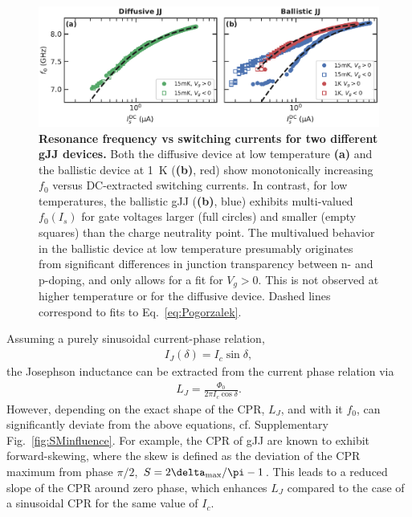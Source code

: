 \begin{figure}[t]
	\centering
	\includegraphics[width=\linewidth]{chapter-gJJ-CPR/figs/Figure2}
	\caption{
		\textbf{Resonance frequency vs switching currents for two different gJJ devices.}
		Both the diffusive device at low temperature \textbf{(a)} and the ballistic device at \SI{1}{\kelvin} (\textbf{(b)}, red) show monotonically increasing $f_0$ versus DC-extracted switching currents.
		In contrast, for low temperatures, the ballistic gJJ (\textbf{(b)}, blue) exhibits multi-valued $f_0\left(I_s\right)$ for gate voltages larger (full circles) and smaller (empty squares) than the charge neutrality point.
		The	multivalued behavior in the ballistic device at low temperature presumably originates from significant differences in junction transparency between n- and p-doping, and only allows for a fit for $V_g>0$.
		This is not observed at higher temperature or for the diffusive device.
		Dashed lines correspond to fits to Eq.~\ref{eq:Pogorzalek}.
	}
	\label{fig:figure2}
\end{figure}

Assuming a purely sinusoidal current-phase relation,
%
\begin{align}
I_J(\delta) = I_c\sin\delta,
\label{eq:CPR-sin}
\end{align}
%
the Josephson inductance can be extracted from the current phase relation via
%
\begin{align}
L_J = \frac{\Phi_0}{2\pi I_c \cos\delta}.
\label{eq:LJsin}
\end{align}
%
However, depending on the exact shape of the CPR, $L_J$, and with it $f_0$, can significantly deviate from the above equations, cf. Supplementary Fig.~\ref{fig:SMinfluence}.
%
For example, the CPR of gJJ are known to exhibit forward-skewing, where the skew is defined as the deviation of the CPR maximum from phase $\pi/2$, $S=2\delta_{\rm max}/\pi -1$.
%
This leads to a reduced slope of the CPR around zero phase, which enhances $L_J$ compared to the case of a sinusoidal CPR for the same value of $I_c$.

